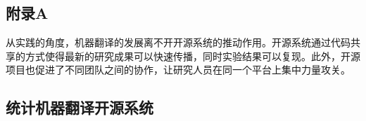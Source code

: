 \begin{appendices}
\chapter{附录A}
\label{appendix-A}
\parinterval  从实践的角度，机器翻译的发展离不开开源系统的推动作用。开源系统通过代码共享的方式使得最新的研究成果可以快速传播，同时实验结果可以复现。此外，开源项目也促进了不同团队之间的协作，让研究人员在同一个平台上集中力量攻关。


\section{统计机器翻译开源系统}


\end{appendices}
